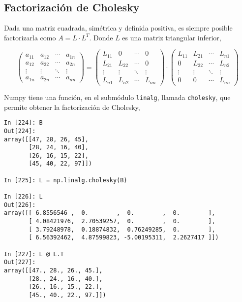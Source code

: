\begin{paracol}{2}
\subsection{Factorización de Cholesky}\label{chol}
Dada una matriz cuadrada, simétrica y definida positiva, es siempre posible factorizarla como $A=L\cdot L^T$. Donde $L$ es una matriz triangular inferior,
\end{paracol}
\begin{equation*}
\begin{pmatrix}
a_{11}& a_{12}& \cdots & a_{1n}\\
a_{12}& a_{22}& \cdots & a_{2n}\\
\vdots & \vdots & \ddots & \vdots\\
a_{1n}& a_{2n}& \cdots & a_{nn}
\end{pmatrix}=\begin{pmatrix}
L_{11}& 0& \cdots & 0\\
L_{21}& L_{22}& \cdots & 0\\
\vdots & \vdots & \ddots & \vdots\\
L_{n1}& L_{n2}& \cdots & L_{nn}
\end{pmatrix} \cdot \begin{pmatrix}
L_{11}& L_{21}& \cdots & L_{n1}\\
0& L_{22}& \cdots & L_{n2}\\
\vdots & \vdots & \ddots & \vdots\\
0& 0& \cdots & L_{nn}
\end{pmatrix}
\end{equation*}
\begin{paracol}{2}
Numpy tiene una función, en el submódulo \texttt{linalg}, llamada \texttt{cholesky}, que permite obtener la factorización de Cholesky, 
\end{paracol}
\begin{center}
    \begin{minipage}{0.5\textwidth}
    \begin{verbatim}
In [224]: B
Out[224]: 
array([[47, 28, 26, 45],
       [28, 24, 16, 40],
       [26, 16, 15, 22],
       [45, 40, 22, 97]])

In [225]: L = np.linalg.cholesky(B)

In [226]: L
Out[226]: 
array([[ 6.8556546 ,  0.        ,  0.        ,  0.        ],
       [ 4.08421976,  2.70539257,  0.        ,  0.        ],
       [ 3.79248978,  0.18874832,  0.76249285,  0.        ],
       [ 6.56392462,  4.87599823, -5.00195311,  2.2627417 ]])

In [227]: L @ L.T
Out[227]: 
array([[47., 28., 26., 45.],
       [28., 24., 16., 40.],
       [26., 16., 15., 22.],
       [45., 40., 22., 97.]])
    \end{verbatim}
        
    \end{minipage}
\end{center}

